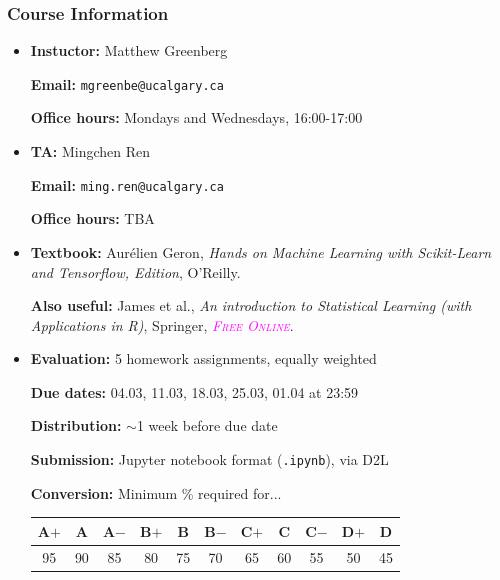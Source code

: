\documentclass[xcolor={dvipsnames}]{beamer}
\renewcommand{\th}[1]{\textcolor{Fuchsia}{\emph{#1}}}
\begin{document}
\begin{frame}
    \frametitle{Course Information}

    \begin{itemize}
        \setlength\parskip{0.75em}
        \item \textbf{Instuctor:} Matthew Greenberg
        
        \textbf{Email:} \texttt{mgreenbe@ucalgary.ca}

        \textbf{Office hours:} Mondays and Wednesdays, 16:00-17:00

        \item \textbf{TA:} Mingchen Ren
        
        \textbf{Email:} \texttt{ming.ren@ucalgary.ca}
        
        \textbf{Office hours:} TBA

        \item \textbf{Textbook:} Aur\'elien Geron, \emph{Hands on Machine Learning with Scikit-Learn and Tensorflow,  Edition}, O'Reilly.
        
        \textbf{Also useful:} James et al., \emph{An introduction to Statistical Learning (with Applications in R)}, Springer, \th{\textsc{Free Online}}.
    \end{itemize}
\end{frame}

\begin{frame}

    \begin{itemize}
        \setlength\parskip{1em}
        \item \textbf{Evaluation:} 5 homework assignments, equally weighted
        
        \textbf{Due dates:} 04.03, 11.03, 18.03, 25.03, 01.04 at 23:59

        \textbf{Distribution:} $\sim$1 week before due date

        \textbf{Submission:} Jupyter notebook format (\texttt{.ipynb}), via D2L

        \textbf{Conversion:} Minimum \% required for...

        \begin{center}
        \begin{tabular}{c|c|c|c|c|c|c|c|c|c|c}
            A$+$&A&A$-$&B$+$&B&B$-$&C$+$&C&C$-$&D$+$&D\\\hline
            95&90&85&80&75&70&65&60&55&50&45
        \end{tabular}
    \end{center}
    \end{itemize}
\end{frame}
\end{document}
